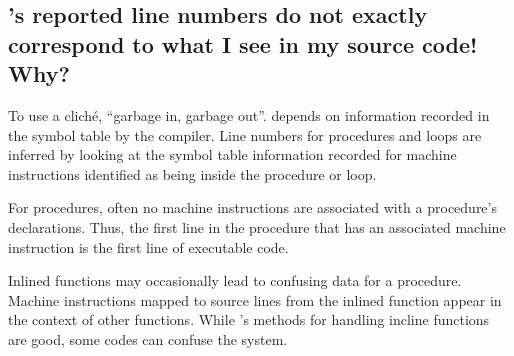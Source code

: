 \documentclass[11pt,twoside,letterpaper]{report}
\begin{document}




\subsection{\hpcviewer{}'s reported line numbers do not exactly correspond to what I see in my source code!  Why?}

To use a clich\'{e}, ``garbage in, garbage out''.
\HPCToolkit{} depends on information recorded in the symbol table by the compiler.
Line numbers for procedures and loops are inferred by looking at the symbol table information recorded for machine instructions identified as being inside the procedure or loop.

For procedures, often no machine instructions are associated with a procedure's declarations.
Thus, the first line in the procedure that has an associated machine instruction is the first line of executable code.

Inlined functions may occasionally lead to confusing data for a procedure.
Machine instructions mapped to source lines from the inlined function appear in the context of other functions.
While \hpcprof{}'s methods for handling incline functions are good, some codes can confuse the system.
\end{document}
